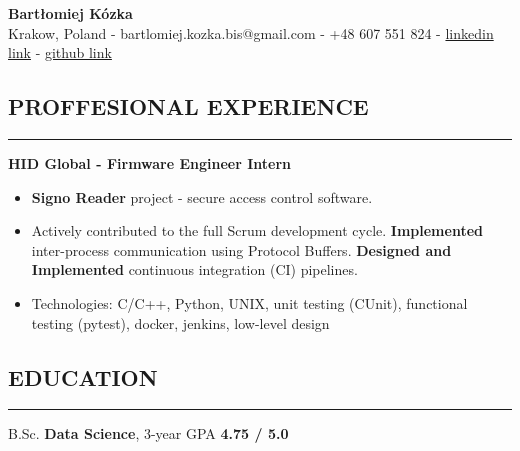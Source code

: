 \documentclass[9pt]{extarticle}
\begin{document}
\begin{center}
{\LARGE{\textbf{Bartłomiej Kózka}}} \\
\vspace{0.2cm}
Krakow, Poland - bartlomiej.kozka.bis@gmail.com - +48 607 551 824 - 
    \href{https://www.linkedin.com/in/bart%C5%82omiejkozka44/}{linkedin link} -
    \href{https://github.com/bartlomiejkozka}{github link}
\end{center}


\subsection*{PROFFESIONAL EXPERIENCE}
\vspace{-1.5em}
\rule{\textwidth}{0.1pt}
\vspace{-0.5em}

\noindent\textbf{HID Global - Firmware Engineer Intern}
\begin{itemize}[itemsep=-3pt, topsep=3pt]
    \item \textbf{Signo Reader} project - secure access control software.
    \item Actively contributed to the full Scrum development cycle. 
          \textbf{Implemented} inter-process communication using Protocol Buffers.
          \textbf{Designed and Implemented} continuous integration (CI) pipelines.
    \item Technologies: C/C++, Python, UNIX, unit testing (CUnit), functional testing (pytest), docker, jenkins, low-level design
\end{itemize}


\subsection*{EDUCATION}
\vspace{-1.5em}
\rule{\textwidth}{0.1pt}
\vspace{-0.5em}

\noindent
{}
B.Sc. \textbf{Data Science}, 3-year GPA \textbf{4.75 / 5.0}

\end{document}

